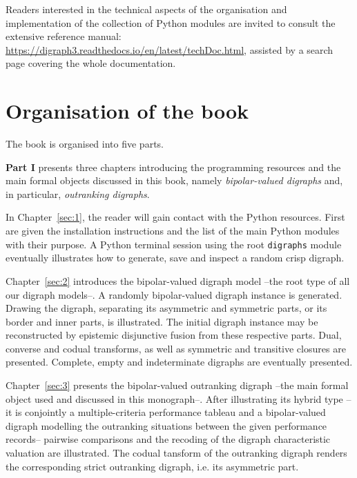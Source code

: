 Readers interested in the technical aspects of the organisation and implementation of the collection of \Digraph Python modules are invited to consult the extensive reference manual: \href{https://digraph3.readthedocs.io/en/latest/techDoc.html}{https://digraph3.readthedocs.io/en/latest/techDoc.html}, assisted by a search page covering the whole \Digraph documentation. 

{}
\section*{Organisation of the book}
\label{sec:0.2}

The book is organised into five parts.
\vspace{5pt}

\textbf{Part I} presents three chapters introducing the \Digraph programming resources and the main formal objects discussed in this book, namely \emph{bipolar-valued digraphs} and, in particular, \emph{outranking digraphs}.

In Chapter~\ref{sec:1}, the reader will gain contact with the \Digraph Python resources. First are given the installation instructions and the list of the main \Digraph Python modules with their purpose. A Python terminal session using the root \texttt{digraphs} module eventually illustrates how to generate, save and inspect a random crisp digraph.

Chapter~\ref{sec:2} introduces the bipolar-valued digraph model --the root type of all our digraph models--. A randomly bipolar-valued digraph instance is generated. Drawing the digraph, separating its asymmetric and symmetric parts, or its border and inner parts, is illustrated. The initial digraph instance may be reconstructed by epistemic disjunctive fusion from these respective parts. Dual, converse and codual transforms, as well as symmetric and transitive closures are presented. Complete, empty and indeterminate digraphs are eventually presented.

Chapter~\ref{sec:3} presents the bipolar-valued outranking digraph --the main formal object used and discussed in this monograph--. After illustrating its hybrid type --it is conjointly a multiple-criteria performance tableau and a bipolar-valued digraph modelling the outranking situations between the given performance records-- pairwise comparisons and the recoding of the digraph characteristic valuation are illustrated. The codual tansform of the outranking digraph renders the corresponding strict outranking digraph, i.e. its asymmetric part. 
\vspace{5pt}

